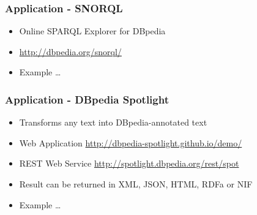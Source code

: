 \begin{frame}
\frametitle{Application - SNORQL}
\begin{itemize}
  \item Online SPARQL Explorer for DBpedia
  \item \url{http://dbpedia.org/snorql/}
  \item Example \ldots
\end{itemize}
\end{frame}


\begin{frame}
\frametitle{Application - DBpedia Spotlight}
\begin{itemize}
  \item Transforms any text into DBpedia-annotated text
  \item Web Application \url{http://dbpedia-spotlight.github.io/demo/}
  \item REST Web Service \url{http://spotlight.dbpedia.org/rest/spot}
  \item Result can be returned in XML, JSON, HTML, RDFa or NIF 
  \item Example \ldots
\end{itemize}
\end{frame}
